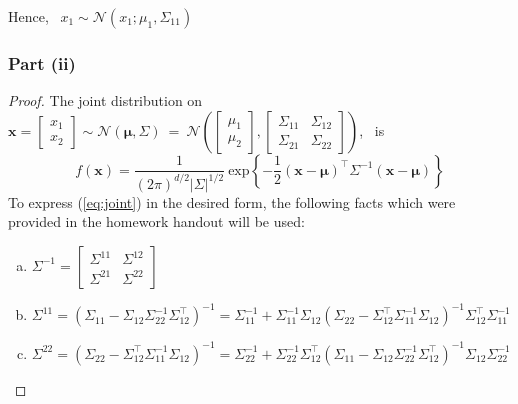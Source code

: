 \documentclass[twoside,11pt]{homework}
\DeclarePairedDelimiter{\2norm}{\lVert}{\rVert^2_2}
\newcommand{\1}[1]{\mathds{1}\left[#1\right]}
\begin{document}
Hence, \ $x_1 \sim \mathcal{N}\left(x_1; \mu_1, \Sigma_{11}\right)$

\newpage

\subsubsection*{Part (ii)} 
\begin{proof}
The joint distribution on \ $\textbf{x} =  \begin{bmatrix} x_1 \\ x_2 \end{bmatrix} \sim \mathcal{N}\left(\bm{\mu}, \Sigma \right) \ = \ \mathcal{N}\left(\begin{bmatrix} \mu_1 \\ \mu_2 \end{bmatrix}, \begin{bmatrix} \Sigma_{11} & \Sigma_{12} \\ \Sigma_{21} & \Sigma_{22} \end{bmatrix} \right)$, \  is 
\begin{equation} \label{eq:joint}
f(\textbf{x}) = \frac{1}{(2\pi)^{d/2}|\Sigma|^{1/2}} \ \text{exp} \left\lbrace -\frac{1}{2}\left(\textbf{x} - \bm{\mu}\right)^{\top} \Sigma^{-1} \left(\textbf{x} - \bm{\mu}\right) \right\rbrace
\end{equation}
To express (\ref{eq:joint}) in the desired form, the following facts which were provided in the homework handout will be used:

\begin{enumerate}[a.)]
\item $ \Sigma^{-1} = \begin{bmatrix} \Sigma^{11} & \Sigma^{12} \\ \Sigma^{21} & \Sigma^{22} \end{bmatrix}$

\item $\Sigma^{11} = \left(\Sigma_{11} - \Sigma_{12}\Sigma_{22}^{-1}\Sigma_{12}^{\top}\right)^{-1} =  \Sigma_{11}^{-1} + \Sigma_{11}^{-1}\Sigma_{12}\left(\Sigma_{22} - \Sigma_{12}^{\top}\Sigma_{11}^{-1}\Sigma_{12}\right)^{-1}\Sigma_{12}^{\top}\Sigma_{11}^{-1}  $

\item $\Sigma^{22} = \left(\Sigma_{22} - \Sigma_{12}^{\top}\Sigma_{11}^{-1}\Sigma_{12}\right)^{-1} =  \Sigma_{22}^{-1} + \Sigma_{22}^{-1}\Sigma_{12}^{\top}\left(\Sigma_{11} - \Sigma_{12}\Sigma_{22}^{-1}\Sigma_{12}^{\top}\right)^{-1}\Sigma_{12}\Sigma_{22}^{-1}  $


\end{enumerate}
\end{proof}
\end{document}
